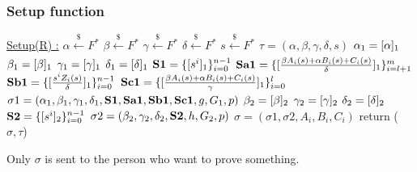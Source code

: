 \subsubsection{Setup function}
\underline{Setup(R) :}
\tabNormal $\alpha \xleftarrow[]{\$} F^*$
\tabNormal $\beta \xleftarrow[]{\$} F^*$
\tabNormal $\gamma \xleftarrow[]{\$} F^*$
\tabNormal $\delta \xleftarrow[]{\$} F^*$ 
\tabNormal $s \xleftarrow[]{\$} F^*$
\tabNormal $\tau = (\alpha, \beta,\gamma,\delta,s)$
\tabNormal $\textbf{$\alpha_1$} = [\alpha]_1$
\tabNormal $\textbf{$\beta_1$} = [\beta]_1$
\tabNormal $\textbf{$\gamma_1$} = [\gamma]_1$
\tabNormal $\textbf{$\delta_1$} = [\delta]_1$
\tabNormal $\textbf{S1}=\{[s^i]_1\}_{i=0}^{n-1}$
\tabNormal $\textbf{Sa1} = \{[\frac{\beta A_i (s) + \alpha B_i (s) + C_i (s)}{\delta}]_1\}_{i=l+1}^m$
\tabNormal $\textbf{Sb1} = \{[\frac{s^i Z_i(s)}{\delta}]_1\}_{i=0}^{n-1}$
\tabNormal $\textbf{Sc1} = \{[\frac{\beta A_i (s) + \alpha B_i (s) + C_i (s)}{\gamma}]_1\}_{i=0}^l$
\tabNormal $\sigma1=(\textbf{$\alpha_1$}, \textbf{$\beta_1$},\textbf{$\gamma_1$},\textbf{$\delta_1$}, \textbf{S1}, \textbf{Sa1} , \textbf{Sb1},\textbf{Sc1}, g, G_1,p)$
\tabNormal $\textbf{$\beta_2$} = [\beta]_2$
\tabNormal $\textbf{$\gamma_2$} = [\gamma]_2$
\tabNormal $\textbf{$\delta_2$} = [\delta]_2$
\tabNormal $\textbf{S2} = \{[s^i]_2\}_{i=0}^{n-1}$
\tabNormal $\sigma2=(\textbf{$\beta_2$},\textbf{$\gamma_2$},\textbf{$\delta_2$}, \textbf{S2}, h, G_2,p)$
\tabNormal $\sigma = (\sigma1, \sigma2, A_i, B_i, C_i)$
\tabNormal return ($\sigma, \tau$)

Only $\sigma$ is sent to the person who want to prove something.